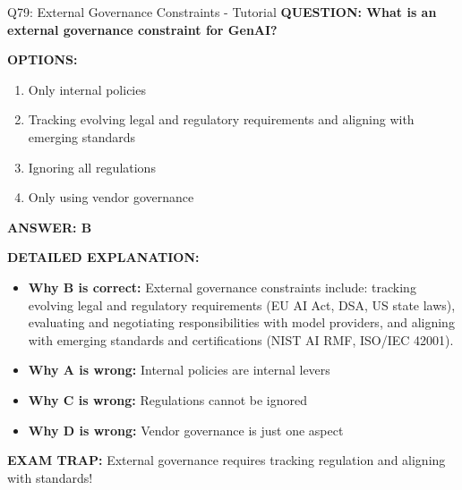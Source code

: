 \documentclass[8pt]{beamer}
\begin{document}
	\begin{frame}{Q79: External Governance Constraints - Tutorial}
		\fontsize{6.5}{7.5}\selectfont
		\textbf{QUESTION: What is an external governance constraint for GenAI?}
		
		\vspace{0.1cm}
		\textbf{OPTIONS:}
		\begin{enumerate}
			\item Only internal policies
			\item Tracking evolving legal and regulatory requirements and aligning with emerging standards
			\item Ignoring all regulations
			\item Only using vendor governance
		\end{enumerate}
		
		\vspace{0.1cm}
		\textcolor{myblue}{\textbf{ANSWER: B}}
		
		\vspace{0.1cm}
		\textbf{DETAILED EXPLANATION:}
		\begin{itemize}
			\item \textbf{Why B is correct:} External governance constraints include: tracking evolving legal and regulatory requirements (EU AI Act, DSA, US state laws), evaluating and negotiating responsibilities with model providers, and aligning with emerging standards and certifications (NIST AI RMF, ISO/IEC 42001).
			\item \textbf{Why A is wrong:} Internal policies are internal levers
			\item \textbf{Why C is wrong:} Regulations cannot be ignored
			\item \textbf{Why D is wrong:} Vendor governance is just one aspect
		\end{itemize}
		
		\textcolor{myred}{\textbf{EXAM TRAP:}} External governance requires \textcolor{myblue}{tracking regulation and aligning with standards}!
	\end{frame}
	
\end{document}
